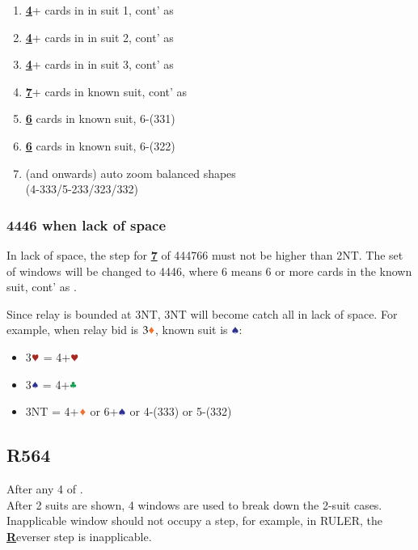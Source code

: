 \documentclass{article}
\newcommand*{\ccc}{\textcolor{ForestGreen}{\clubsuit}}
\newcommand*{\ddd}{\textcolor{Orange}{\vardiamondsuit}}
\newcommand*{\hhh}{\textcolor{Mahogany}{\varheartsuit}}
\newcommand*{\sss}{\textcolor{Blue}{\spadesuit}}
\begin{document}
\begin{multicols}{2}
\begin{enumerate}
    \setlength\itemsep{-0.2em}
    \item \textbf{\underline{4}}+ cards in in suit 1, cont' as 
    \item \textbf{\underline{4}}+ cards in in suit 2, cont' as
    \item \textbf{\underline{4}}+ cards in in suit 3, cont' as
    \item \textbf{\underline{7}}+ cards in known suit, cont' as
    \item \textbf{\underline{6}} cards in known suit, 6-(331)
    \item \textbf{\underline{6}} cards in known suit, 6-(322)
    \item (and onwards) auto zoom balanced shapes \\
        (4-333/5-233/323/332)
\end{enumerate}

\pagebreak

\subsubsection{4446 when lack of space}\label{sec:4446}
In lack of space, the step for \textbf{\underline{7}} of 444766 must not be higher than 2NT. The set of windows will be changed to 4446, where 6 means 6 or more cards in the known suit, cont' as .

\noindent Since relay is bounded at 3NT, 3NT will become catch all in lack of space. For example, when relay bid is $3\ddd$, known suit is $\sss$:
\begin{itemize}
    \setlength\itemsep{-0.2em}
    \item 3$\hhh$ = 4+$\hhh$
    \item 3$\sss$ = 4+$\ccc$
    \item 3NT = 4+$\ddd$ or 6+$\sss$ or 4-(333) or 5-(332)
\end{itemize}

\subsection{R564}\label{sec:R564}
After any 4 of . \\
After 2 suits are shown, 4 windows are used to break down the 2-suit cases. Inapplicable window should not occupy a step, for example, in RULER, the \textbf{\underline{R}}everser step is inapplicable.


\end{multicols}
\end{document}

